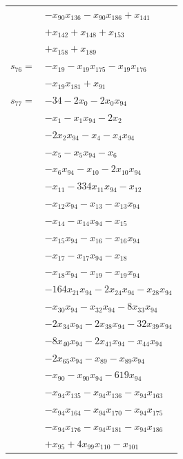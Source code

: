 \begin{longtable}{@{}r@{\;}l@{}}
 & \(\displaystyle -x_{90}x_{136} -x_{90}x_{186} +x_{141}\) \\
 & \(\displaystyle +x_{142} +x_{148} +x_{153}\) \\
 & \(\displaystyle +x_{158} +x_{189}\) \\[3pt]
\(s_{76}=\) & \(\displaystyle -x_{19} -x_{19}x_{175} -x_{19}x_{176}\) \\
 & \(\displaystyle -x_{19}x_{181} +x_{91}\) \\[3pt]
\(s_{77}=\) & \(\displaystyle -34 -2x_{0} -2x_{0}x_{94}\) \\
 & \(\displaystyle -x_{1} -x_{1}x_{94} -2x_{2}\) \\
 & \(\displaystyle -2x_{2}x_{94} -x_{4} -x_{4}x_{94}\) \\
 & \(\displaystyle -x_{5} -x_{5}x_{94} -x_{6}\) \\
 & \(\displaystyle -x_{6}x_{94} -x_{10} -2x_{10}x_{94}\) \\
 & \(\displaystyle -x_{11} -334x_{11}x_{94} -x_{12}\) \\
 & \(\displaystyle -x_{12}x_{94} -x_{13} -x_{13}x_{94}\) \\
 & \(\displaystyle -x_{14} -x_{14}x_{94} -x_{15}\) \\
 & \(\displaystyle -x_{15}x_{94} -x_{16} -x_{16}x_{94}\) \\
 & \(\displaystyle -x_{17} -x_{17}x_{94} -x_{18}\) \\
 & \(\displaystyle -x_{18}x_{94} -x_{19} -x_{19}x_{94}\) \\
 & \(\displaystyle -164x_{21}x_{94} -2x_{24}x_{94} -x_{28}x_{94}\) \\
 & \(\displaystyle -x_{30}x_{94} -x_{32}x_{94} -8x_{33}x_{94}\) \\
 & \(\displaystyle -2x_{34}x_{94} -2x_{38}x_{94} -32x_{39}x_{94}\) \\
 & \(\displaystyle -8x_{40}x_{94} -2x_{41}x_{94} -x_{44}x_{94}\) \\
 & \(\displaystyle -2x_{65}x_{94} -x_{89} -x_{89}x_{94}\) \\
 & \(\displaystyle -x_{90} -x_{90}x_{94} -619x_{94}\) \\
 & \(\displaystyle -x_{94}x_{135} -x_{94}x_{136} -x_{94}x_{163}\) \\
 & \(\displaystyle -x_{94}x_{164} -x_{94}x_{170} -x_{94}x_{175}\) \\
 & \(\displaystyle -x_{94}x_{176} -x_{94}x_{181} -x_{94}x_{186}\) \\
 & \(\displaystyle +x_{95} +4x_{99}x_{110} -x_{101}\) \\

\end{longtable}
